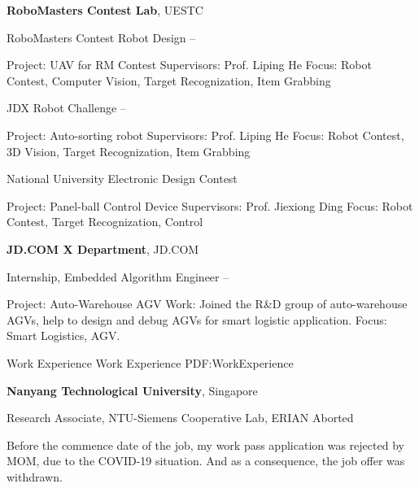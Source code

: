 \documentclass[letterpaper,MMMyyyy,nonstopmode]{simpleresumecv}
\begin{document}
\begin{Body}
\Gap
\Entry
{\textbf{RoboMasters Contest Lab}},
UESTC

\BulletItem
RoboMasters Contest Robot Design
\hfill
{} --
\begin{Detail}
	\SubBulletItem
	Project:
	UAV for RM Contest
	\SubBulletItem
	Supervisors:
	Prof. Liping He
	\SubBulletItem
	Focus:
	Robot Contest, Computer Vision, Target Recognization, Item Grabbing
\end{Detail}

\BulletItem
JDX Robot Challenge \cite{lxyjd2017}
\hfill
{} --
\begin{Detail}
	\SubBulletItem
	Project:
	Auto-sorting robot
	\SubBulletItem
	Supervisors:
	Prof. Liping He
	\SubBulletItem
	Focus:
	Robot Contest, 3D Vision, Target Recognization, Item Grabbing
\end{Detail}

\BulletItem
National University Electronic Design Contest
\hfill
{} 
\begin{Detail}
	\SubBulletItem
	Project:
	Panel-ball Control Device
	\SubBulletItem
	Supervisors:
	Prof. Jiexiong Ding
	\SubBulletItem
	Focus:
	Robot Contest, Target Recognization, Control
\end{Detail}

\Gap
\Entry
{\textbf{JD.COM X Department}}, JD.COM

\BulletItem
Internship, Embedded Algorithm Engineer
\hfill
{} --
\begin{Detail}
	\SubBulletItem
	Project:
	Auto-Warehouse AGV
	\SubBulletItem
	Work: Joined the R\&D group of auto-warehouse AGVs, help to design and debug AGVs for smart logistic application.
	\SubBulletItem
	Focus:
	Smart Logistics, AGV.
\end{Detail}


\Section
{Work\newline
	Experience}
{Work Experience}
{PDF:WorkExperience}

\Entry
{\textbf{Nanyang Technological University}},
Singapore

\BulletItem
Research Associate,
NTU-Siemens Cooperative Lab, ERIAN
\hfill
Aborted
\begin{Detail}
	\SubBulletItem
	Before the commence date of the job, my work pass application was rejected by MOM, due to the COVID-19 situation. And as a consequence, the job offer was withdrawn.
\end{Detail}


\end{Body}
\end{document}
